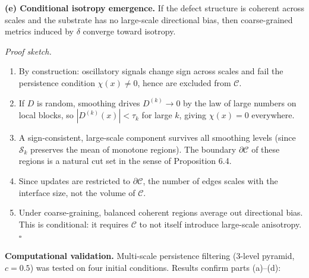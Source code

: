 \documentclass[
]{article}
\begin{document}
\textbf{(e) Conditional isotropy emergence.} If the defect structure is
coherent across scales and the substrate has no large-scale directional
bias, then coarse-grained metrics induced by \(\delta\) converge toward
isotropy.

\emph{Proof sketch.}

\begin{enumerate}
\def\labelenumi{(\alph{enumi})}
\item
  By construction: oscillatory signals change sign across scales and
  fail the persistence condition \(\chi(x) \neq 0\), hence are excluded
  from \(\mathcal{C}\).
\item
  If \(D\) is random, smoothing drives \(D^{(k)} \to 0\) by the law of
  large numbers on local blocks, so \(|D^{(k)}(x)| < \tau_k\) for large
  \(k\), giving \(\chi(x) = 0\) everywhere.
\item
  A sign-consistent, large-scale component survives all smoothing levels
  (since \(\mathcal{S}_k\) preserves the mean of monotone regions). The
  boundary \(\partial\mathcal{C}\) of these regions is a natural cut set
  in the sense of Proposition 6.4.
\item
  Since updates are restricted to \(\partial\mathcal{C}\), the number of
  edges scales with the interface size, not the volume of
  \(\mathcal{C}\).
\item
  Under coarse-graining, balanced coherent regions average out
  directional bias. This is conditional: it requires \(\mathcal{C}\) to
  not itself introduce large-scale anisotropy. \(\square\)
\end{enumerate}

\textbf{Computational validation.} Multi-scale persistence filtering
(3-level pyramid, \(c = 0.5\)) was tested on four initial conditions.
Results confirm parts (a)--(d):
\end{document}
